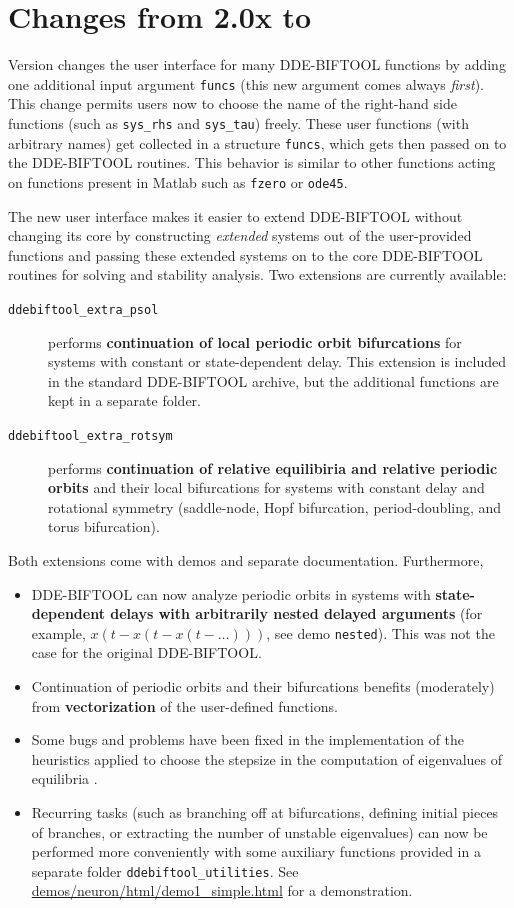 \documentclass[10pt]{scrartcl}
\newcommand{\DDEBIFCODE}{\textsc{DDE-BIFTOOL}}
\newcommand{\blist}[1]{\mbox{\lstinline!#1!}}
\begin{document}
\section{Changes from 2.0x to \version}
\label{sec:changes}
Version \version{} changes the user interface for many \DDEBIFCODE{}
functions by adding one additional input argument \blist{funcs} (this
new argument comes always \emph{first}). This change permits users now
to choose the name of the right-hand side functions (such as
\blist{sys_rhs} and \blist{sys_tau}) freely. These user functions
(with arbitrary names) get collected in a structure \blist{funcs},
which gets then passed on to the \DDEBIFCODE{} routines. This behavior
is similar to other functions acting on functions present in Matlab
such as \blist{fzero} or \blist{ode45}.

The new user interface makes it easier to extend \DDEBIFCODE{} without
changing its core by constructing \emph{extended} systems out of the
user-provided functions and passing these extended systems on to the
core \DDEBIFCODE{} routines for solving and stability analysis. Two
extensions are currently available:
\begin{description}
\item[\texttt{ddebiftool\_extra\_psol}] performs \textbf{continuation of local
  periodic orbit bifurcations} for systems with constant or
  state-dependent delay. This extension is included in the standard
  \DDEBIFCODE{} archive, but the additional functions are kept in a
  separate folder.
\item[\texttt{ddebiftool\_extra\_rotsym}] performs \textbf{continuation of
  relative equilibiria and relative periodic orbits} and their local
  bifurcations for systems with constant delay and rotational symmetry
  (saddle-node, Hopf bifurcation, period-doubling, and torus
  bifurcation).
\end{description}
Both extensions come with demos and separate documentation.
Furthermore,
\begin{itemize}
\item \DDEBIFCODE{} can now analyze periodic orbits in systems with
  \textbf{state-dependent delays with arbitrarily nested delayed
    arguments} (for example, $x(t-x(t-x(t-\ldots)))$, see demo
  \texttt{nested}). This was not the case for the original
  \DDEBIFCODE{}.
\item Continuation of periodic orbits and their bifurcations benefits
  (moderately) from \textbf{vectorization} of the user-defined functions.
\item Some bugs and problems have been fixed in the implementation of
  the heuristics applied to choose the stepsize in the computation of
  eigenvalues of equilibria \cite{VLR08}.
\item Recurring tasks (such as branching off at bifurcations, defining
  initial pieces of branches, or extracting the number of unstable
  eigenvalues) can now be performed more conveniently with some
  auxiliary functions provided in a separate folder
  \texttt{ddebiftool\_utilities}. See
  \url{demos/neuron/html/demo1_simple.html} for a demonstration.
\end{itemize}
\end{document}
